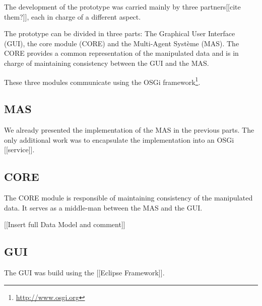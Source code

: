 The development of the prototype was carried mainly by three partners[[cite them?]], each in charge of a different aspect.

The prototype can be divided in three parts: The Graphical User Interface (GUI), the core module (CORE) and the Multi-Agent Système (MAS). The CORE provides a common representation of the manipulated data and is in charge of maintaining consistency between the GUI and the MAS.

These three modules communicate using the OSGi framework\footnote{\url{http://www.osgi.org}}.

\subsection{MAS}

We already presented the implementation of the MAS in the previous parts. The only additional work was to encapsulate the implementation into an OSGi [[service]].

\subsection{CORE}

The CORE module is responsible of maintaining consistency of the manipulated data. It serves as a middle-man between the MAS and the GUI.

[[Insert full Data Model and comment]]

\subsection{GUI}

The GUI was build using the [[Eclipse Framework]].


